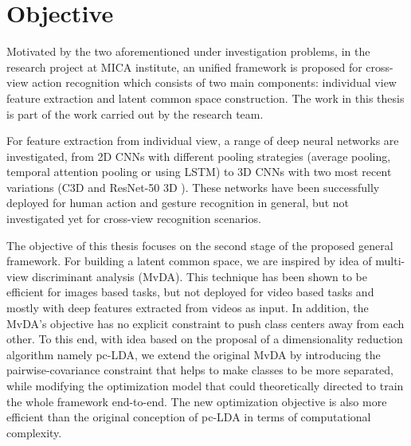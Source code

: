    \section{Objective} \label{sec:intro_objective}
        Motivated by the two aforementioned under investigation problems, in the research project at MICA institute, an unified framework is proposed for cross-view action recognition which consists of two main components: individual view feature extraction and latent common space construction. The work in this thesis is part of the work carried out by the research team.

        For feature extraction from individual view, a range of deep neural networks are investigated, from 2D CNNs with different pooling strategies (average pooling, temporal attention pooling or using LSTM) to 3D CNNs with two most recent variations (C3D \cite{tran2015learning} and ResNet-50 3D \cite{hara2018can}).
        These networks have been successfully deployed for human action and gesture recognition in general, but not investigated yet for cross-view recognition scenarios.

        The objective of this thesis focuses on the second stage of the proposed general framework.
        For building a latent common space, we are inspired by idea of multi-view discriminant analysis (MvDA).
        This technique has been shown to be efficient for images based tasks, but not deployed for video based tasks and mostly with deep features extracted from videos as input.
        In addition, the MvDA's objective has no explicit constraint to push class centers away from each other.
        To this end, with idea based on the proposal of a dimensionality reduction algorithm namely pc-LDA, we extend the original MvDA by introducing the pairwise-covariance constraint that helps to make classes to be more separated, while modifying the optimization model that could theoretically directed to train the whole framework end-to-end.
        The new optimization objective is also more efficient than the original conception of pc-LDA in terms of computational complexity.

